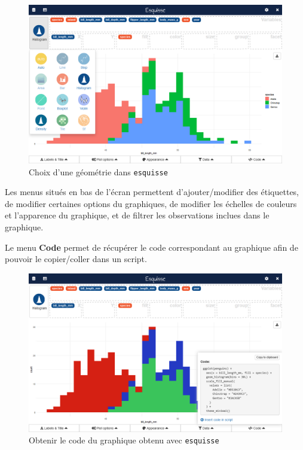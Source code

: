 \documentclass[
  letterpaper,
  DIV=11,
  numbers=noendperiod,
  oneside]{scrreprt}
\begin{document}
\begin{figure}

{\centering \includegraphics{analyses/ressources/esquisse-geometries.png}

}

\caption{\label{fig-esquisse-géométrie}Choix d'une géométrie dans
\texttt{esquisse}}

\end{figure}

Les menus situés en bas de l'écran permettent d'ajouter/modifier des
étiquettes, de modifier certaines options du graphiques, de modifier les
échelles de couleurs et l'apparence du graphique, et de filtrer les
observations inclues dans le graphique.

Le menu \textbf{Code} permet de récupérer le code correspondant au
graphique afin de pouvoir le copier/coller dans un script.

\begin{figure}

{\centering \includegraphics{analyses/ressources/esquisse-controls-code.png}

}

\caption{\label{fig-esquisse-code}Obtenir le code du graphique obtenu
avec \texttt{esquisse}}

\end{figure}
\end{document}
